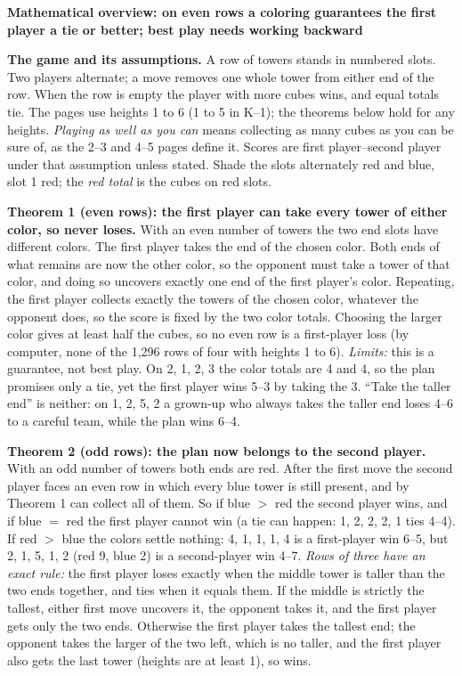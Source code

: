 \documentclass[11pt]{article}
\newcommand{\head}[1]{\par\Needspace{6\baselineskip}\medskip\textbf{\large #1}\par}
\begin{document}
\head{Mathematical overview: on even rows a coloring guarantees the first player a tie or better; best play needs working backward}
\textbf{The game and its assumptions.} A row of towers stands in numbered slots. Two players alternate; a move removes one whole tower from either end of the row. When the row is empty the player with more cubes wins, and equal totals tie. The pages use heights 1 to 6 (1 to 5 in K--1); the theorems below hold for any heights. \emph{Playing as well as you can} means collecting as many cubes as you can be sure of, as the 2--3 and 4--5 pages define it. Scores are first player--second player under that assumption unless stated. Shade the slots alternately red and blue, slot 1 red; the \emph{red total} is the cubes on red slots.

\textbf{Theorem 1 (even rows): the first player can take every tower of either color, so never loses.} With an even number of towers the two end slots have different colors. The first player takes the end of the chosen color. Both ends of what remains are now the other color, so the opponent must take a tower of that color, and doing so uncovers exactly one end of the first player's color. Repeating, the first player collects exactly the towers of the chosen color, whatever the opponent does, so the score is fixed by the two color totals. Choosing the larger color gives at least half the cubes, so no even row is a first-player loss (by computer, none of the 1,296 rows of four with heights 1 to 6). \emph{Limits:} this is a guarantee, not best play. On 2, 1, 2, 3 the color totals are 4 and 4, so the plan promises only a tie, yet the first player wins 5--3 by taking the 3. ``Take the taller end'' is neither: on 1, 2, 5, 2 a grown-up who always takes the taller end loses 4--6 to a careful team, while the plan wins 6--4.

\textbf{Theorem 2 (odd rows): the plan now belongs to the second player.} With an odd number of towers both ends are red. After the first move the second player faces an even row in which every blue tower is still present, and by Theorem 1 can collect all of them. So if blue $>$ red the second player wins, and if blue $=$ red the first player cannot win (a tie can happen: 1, 2, 2, 2, 1 ties 4--4). If red $>$ blue the colors settle nothing: 4, 1, 1, 1, 4 is a first-player win 6--5, but 2, 1, 5, 1, 2 (red 9, blue 2) is a second-player win 4--7. \emph{Rows of three have an exact rule:} the first player loses exactly when the middle tower is taller than the two ends together, and ties when it equals them. If the middle is strictly the tallest, either first move uncovers it, the opponent takes it, and the first player gets only the two ends. Otherwise the first player takes the tallest end; the opponent takes the larger of the two left, which is no taller, and the first player also gets the last tower (heights are at least 1), so wins.
\end{document}
